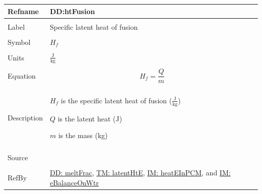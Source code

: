 \documentclass[12pt]{article}
\begin{document}
\noindent \begin{minipage}{\textwidth}
\begin{tabular}{p{} p{}}
\toprule \textbf{Refname} & \textbf{DD:htFusion}
\label{DD:htFusion}
\\ \midrule \\
Label & Specific latent heat of fusion
\\ \midrule \\
Symbol & ${H_{f}}$
\\ \midrule \\
Units & $\frac{\text{J}}{\text{kg}}$
\\ \midrule \\
Equation & \begin{displaymath}
           {H_{f}}=\frac{Q}{m}
           \end{displaymath}
\\ \midrule \\
Description & \begin{symbDescription}
              \item{${H_{f}}$ is the specific latent heat of fusion ($\frac{\text{J}}{\text{kg}}$)}
              \item{$Q$ is the latent heat (J)}
              \item{$m$ is the mass (kg)}
              \end{symbDescription}
\\ \midrule \\
Source & \cite[(pg. 282)]{bueche1986}
\\ \midrule \\
RefBy & \hyperref[DD:meltFrac]{DD: meltFrac}, \hyperref[TM:latentHtE]{TM: latentHtE}, \hyperref[IM:heatEInPCM]{IM: heatEInPCM}, and \hyperref[IM:eBalanceOnWtr]{IM: eBalanceOnWtr}
\\ \bottomrule \end{tabular}
\end{minipage}
\par~
\end{document}
